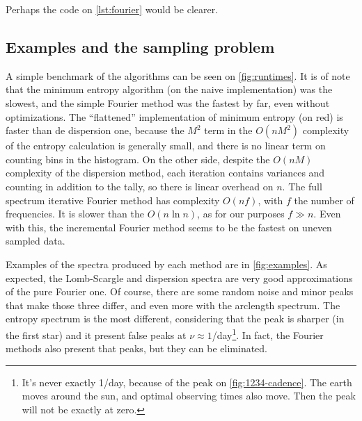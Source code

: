 Perhaps the code on \autoref{lst:fourier} would be clearer.

\subsection{Examples and the sampling problem \label{sec:examples-and-aliases}}

A simple benchmark of the algorithms can be seen on \autoref{fig:runtimes}. 
It is of note that the minimum entropy algorithm (on the naive implementation) was the slowest, 
and the simple Fourier method was the fastest by far, even without optimizations.
The \enquote{flattened} implementation of minimum entropy (on red) is faster than de dispersion one, because the $M^2$ term in the 
$O(nM^2)$ complexity of the entropy calculation is generally small, and there is no linear term on counting bins in the histogram.
On the other side, despite the $O(nM)$ complexity of the dispersion method, each iteration contains variances and counting in addition to the tally,
so there is linear overhead on $n$.
The full spectrum iterative Fourier method has complexity $O(nf)$, with $f$ the number of frequencies.
It is slower than the $O(n \ln n)$, as for our purposes $f\gg n$.
Even with this, the incremental Fourier method seems to be the fastest on uneven sampled data.

Examples of the spectra produced by each method are in \autoref{fig:examples}.
As expected, the Lomb-Scargle and dispersion spectra are very good approximations of the pure Fourier one.
Of course, there are some random noise and minor peaks that make those three differ, and even more with the arclength spectrum.
The entropy spectrum is the most different, considering that the peak is sharper 
(in the first star) and it present false peaks at $\nu\approx 1$/day\footnote{
	It's never exactly 1/day, because of the peak on \autoref{fig:1234-cadence}. 
	The earth moves around the sun, and optimal observing times also move.
	Then the peak will not be exactly at zero.
}. In fact, the Fourier methods also present that peaks, but they can be eliminated.

